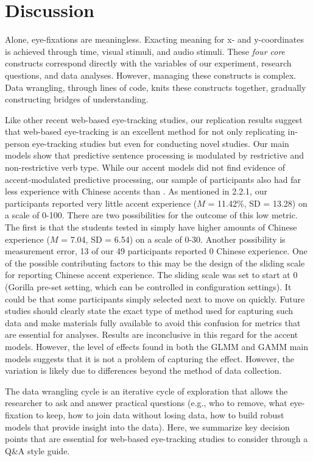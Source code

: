 \section{Discussion}
Alone, eye-fixations are meaningless. Exacting meaning for x- and y-coordinates is achieved
through time, visual stimuli, and audio stimuli. These \textit{four core} constructs correspond directly with the variables of our experiment, research questions, and data analyses. However, managing these constructs is complex. Data wrangling, through lines of code, knits these constructs together, gradually constructing bridges of understanding.

Like other recent web-based eye-tracking studies, our replication results suggest that web-based eye-tracking is an excellent method for not only replicating in-person eye-tracking studies \parencite{Vos_2017, Prystauka_Altmann_Rothman_2023} but even for conducting novel studies. Our main models show that predictive sentence processing is modulated by restrictive and non-restrictive verb type. While our accent models did not find evidence of accent-modulated predictive processing, our sample of participants also had far less experience with Chinese accents than \textcite{Porretta_et_al_2020}. As mentioned in 2.2.1, our participants reported very little accent experience ($M$ = 11.42\%, SD = 13.28) on a scale of 0-100. There are two possibilities for the outcome of this low metric. The first is that the students tested in \textcite{Porretta_et_al_2020} simply have higher amounts of Chinese experience ($M$ = 7.04, SD = 6.54) on a scale of 0-30. Another possibility is measurement error, 13 of our 49 participants reported 0 Chinese experience. One of the possible contributing factors to this may be the design of the sliding scale for reporting Chinese accent experience. The sliding scale was set to start at 0 (Gorilla pre-set setting, which can be controlled in configuration settings). It could be that some participants simply selected next to move on quickly. Future studies should clearly state the exact type of method used for capturing such data and make materials fully available to avoid this confusion for metrics that are essential for analyses. Results are inconclusive in this regard for the accent models. However, the level of effects found in both the GLMM and GAMM main models suggests that it is not a problem of capturing the effect. However, the variation is likely due to differences beyond the method of data collection.

The data wrangling cycle is an iterative cycle of exploration that allows the researcher to ask and answer practical questions (e.g., who to remove, what eye-fixation to keep, how to join data without losing data, how to build robust models that provide insight into the data). Here, we summarize key decision points that are essential for web-based eye-tracking studies to consider through a Q\&A style guide. 

